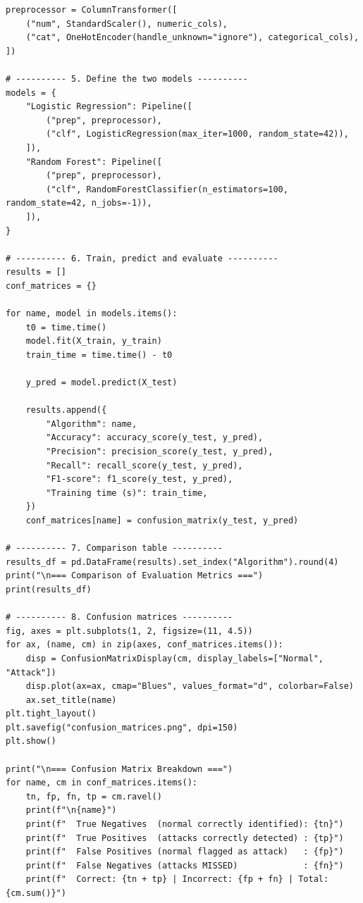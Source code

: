 \documentclass[12pt,a4paper]{article}
\begin{document}
\begin{lstlisting}
preprocessor = ColumnTransformer([
    ("num", StandardScaler(), numeric_cols),
    ("cat", OneHotEncoder(handle_unknown="ignore"), categorical_cols),
])

# ---------- 5. Define the two models ----------
models = {
    "Logistic Regression": Pipeline([
        ("prep", preprocessor),
        ("clf", LogisticRegression(max_iter=1000, random_state=42)),
    ]),
    "Random Forest": Pipeline([
        ("prep", preprocessor),
        ("clf", RandomForestClassifier(n_estimators=100, random_state=42, n_jobs=-1)),
    ]),
}

# ---------- 6. Train, predict and evaluate ----------
results = []
conf_matrices = {}

for name, model in models.items():
    t0 = time.time()
    model.fit(X_train, y_train)
    train_time = time.time() - t0

    y_pred = model.predict(X_test)

    results.append({
        "Algorithm": name,
        "Accuracy": accuracy_score(y_test, y_pred),
        "Precision": precision_score(y_test, y_pred),
        "Recall": recall_score(y_test, y_pred),
        "F1-score": f1_score(y_test, y_pred),
        "Training time (s)": train_time,
    })
    conf_matrices[name] = confusion_matrix(y_test, y_pred)

# ---------- 7. Comparison table ----------
results_df = pd.DataFrame(results).set_index("Algorithm").round(4)
print("\n=== Comparison of Evaluation Metrics ===")
print(results_df)

# ---------- 8. Confusion matrices ----------
fig, axes = plt.subplots(1, 2, figsize=(11, 4.5))
for ax, (name, cm) in zip(axes, conf_matrices.items()):
    disp = ConfusionMatrixDisplay(cm, display_labels=["Normal", "Attack"])
    disp.plot(ax=ax, cmap="Blues", values_format="d", colorbar=False)
    ax.set_title(name)
plt.tight_layout()
plt.savefig("confusion_matrices.png", dpi=150)
plt.show()

print("\n=== Confusion Matrix Breakdown ===")
for name, cm in conf_matrices.items():
    tn, fp, fn, tp = cm.ravel()
    print(f"\n{name}")
    print(f"  True Negatives  (normal correctly identified): {tn}")
    print(f"  True Positives  (attacks correctly detected) : {tp}")
    print(f"  False Positives (normal flagged as attack)   : {fp}")
    print(f"  False Negatives (attacks MISSED)             : {fn}")
    print(f"  Correct: {tn + tp} | Incorrect: {fp + fn} | Total: {cm.sum()}")
\end{lstlisting}
\end{document}
